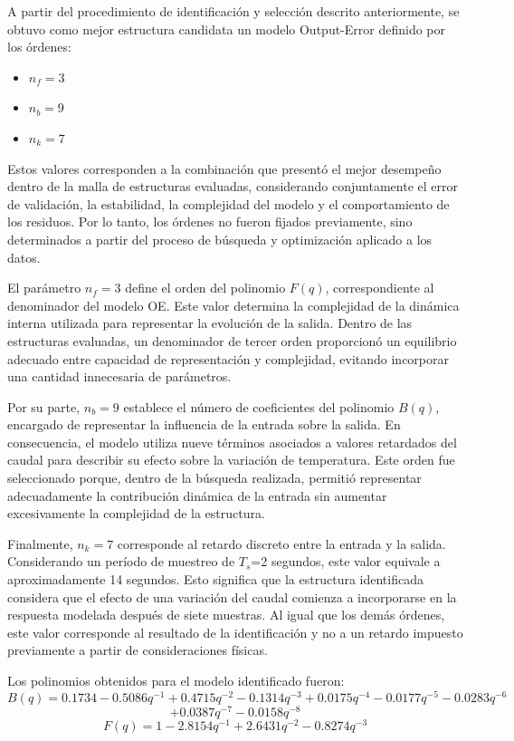 \documentclass[11pt]{report}
\begin{document}
A partir del procedimiento de identificación y selección descrito anteriormente, se obtuvo como mejor estructura candidata un modelo Output-Error definido por los órdenes:
\begin{itemize}
    \item $n_f=3$
    \item $n_b=9$
    \item $n_k=7$
\end{itemize}


Estos valores corresponden a la combinación que presentó el mejor desempeño dentro de la malla de estructuras evaluadas, considerando conjuntamente el error de validación, la estabilidad, la complejidad del modelo y el comportamiento de los residuos. Por lo tanto, los órdenes no fueron fijados previamente, sino determinados a partir del proceso de búsqueda y optimización aplicado a los datos.

El parámetro $n_f=3$ define el orden del polinomio $F(q)$, correspondiente al denominador del modelo OE. Este valor determina la complejidad de la dinámica interna utilizada para representar la evolución de la salida. Dentro de las estructuras evaluadas, un denominador de tercer orden proporcionó un equilibrio adecuado entre capacidad de representación y complejidad, evitando incorporar una cantidad innecesaria de parámetros.

Por su parte, $n_b=9$ establece el número de coeficientes del polinomio $B(q)$, encargado de representar la influencia de la entrada sobre la salida. En consecuencia, el modelo utiliza nueve términos asociados a valores retardados del caudal para describir su efecto sobre la variación de temperatura. Este orden fue seleccionado porque, dentro de la búsqueda realizada, permitió representar adecuadamente la contribución dinámica de la entrada sin aumentar excesivamente la complejidad de la estructura.

Finalmente, $n_k=7$ corresponde al retardo discreto entre la entrada y la salida. Considerando un período de muestreo de $T_s$=2 segundos, este valor equivale a aproximadamente 14 segundos. Esto significa que la estructura identificada considera que el efecto de una variación del caudal comienza a incorporarse en la respuesta modelada después de siete muestras. Al igual que los demás órdenes, este valor corresponde al resultado de la identificación y no a un retardo impuesto previamente a partir de consideraciones físicas.


Los polinomios obtenidos para el modelo identificado fueron:
$$B(q)=0.1734−0.5086q^{−1}+0.4715q^{−2}−0.1314q^{−3}+0.0175q^{−4}−0.0177q^{−5}−0.0283q^{−6}$$
$$+0.0387q^{−7}−0.0158q^{−8}$$
$$F(q)=1−2.8154q^{−1}+2.6431q^{−2}−0.8274q^{−3}$$
\end{document}
